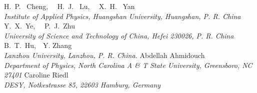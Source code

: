 \begin{center}
{\n H.~P.~ Cheng,~~ H.~J.~ Lu,~~ X.~H.~ Yan }\\
\ls
{\normalsize\it{Institute of Applied Physics, Huangshan University, Huangshan, P. R. China}}
\ks
{\n Y.~X.~Ye,~~ P.~J.~Zhu}\\
\ls
{\normalsize\it{
University of Science and Technology of China, Hefei 230026, P. R. China}}
\ks
%
{\n B.~T.~Hu,~~Y. Zhang}\\
\ls
{\normalsize\it{Lanzhou University, Lanzhou, P. R. China.}}
\ks
%
{\n Abdellah Ahmidouch}\\
\ls
{\normalsize\it{
Department of Physics, North Carolina A \& T State University, Greensboro, NC 27401}}
\ks
{\n Caroline Riedl}\\
\ls
{\normalsize\it{DESY, Notkestrasse 85, 22603 Hamburg, Germany}}
\ks
%
\end{center}



